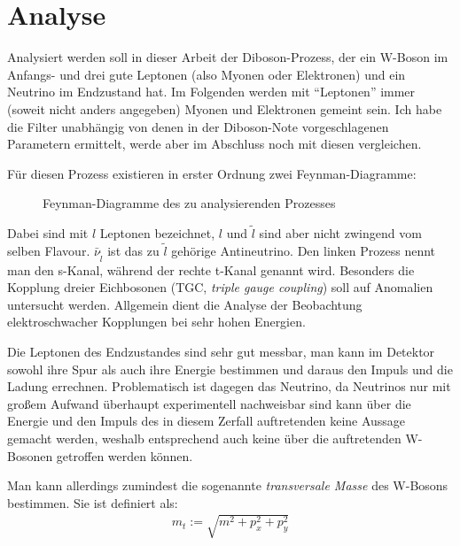 \section{Analyse}
Analysiert werden soll in dieser Arbeit der Diboson-Prozess, der ein W-Boson im
Anfangs- und drei gute Leptonen (also Myonen oder Elektronen) und ein Neutrino
im Endzustand hat. Im Folgenden werden mit "`Leptonen"' immer (soweit nicht
anders angegeben) Myonen und Elektronen gemeint sein. Ich habe die Filter
unabhängig von denen in der Diboson-Note vorgeschlagenen
Parametern\cite{diboson-ana} ermittelt, werde aber im Abschluss noch mit diesen
vergleichen.

Für diesen Prozess existieren in erster Ordnung zwei Feynman-Diagramme:
\begin{figure}[h!]
  \begin{minipage}{0.49\textwidth}
    \centering
    
  \end{minipage}
  \begin{minipage}{0.49\textwidth}
    \centering
    
  \end{minipage}
  \caption{Feynman-Diagramme des zu analysierenden Prozesses}
  \label{fig:feynman}
\end{figure}
Dabei sind mit $l$ Leptonen bezeichnet, $l$ und $\tilde l$ sind aber nicht
zwingend vom selben Flavour. $\bar \nu_{\tilde l}$ ist das zu $\tilde l$
gehörige Antineutrino. Den linken Prozess nennt man den s-Kanal, während der
rechte t-Kanal genannt wird. Besonders die Kopplung dreier Eichbosonen
(TGC, \emph{triple gauge coupling}) soll auf Anomalien untersucht werden.
Allgemein dient die Analyse der Beobachtung elektroschwacher Kopplungen bei sehr
hohen Energien.

Die Leptonen des Endzustandes sind sehr gut messbar, man kann im Detektor sowohl
ihre Spur als auch ihre Energie bestimmen und daraus den Impuls und die Ladung
errechnen.  Problematisch ist dagegen das Neutrino, da Neutrinos nur mit großem
Aufwand überhaupt experimentell nachweisbar sind\cite{needed} kann über die
Energie und den Impuls des in diesem Zerfall auftretenden keine Aussage gemacht
werden, weshalb entsprechend auch keine über die auftretenden W-Bosonen
getroffen werden können.

\label{cha:met}
Man kann allerdings zumindest die sogenannte \emph{transversale Masse} des
W-Bosons bestimmen. Sie ist definiert als:
\begin{align}
  m_t := \sqrt{m^2 + p_x^2 + p_y^2}
  \label{def:trans}
\end{align}

